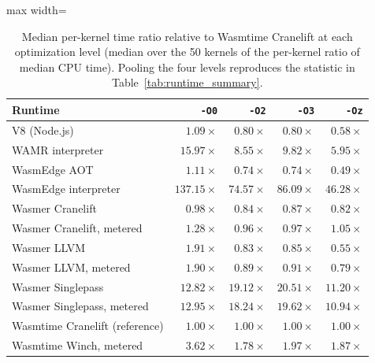 \begin{table}[t]
\caption{Median per-kernel time ratio relative to Wasmtime Cranelift at each optimization level (median over the 50 kernels of the per-kernel ratio of median CPU time). Pooling the four levels reproduces the statistic in Table~\ref{tab:runtime_summary}.}\label{tab:ratio_by_level}
\footnotesize
\setlength{\tabcolsep}{5pt}%
\begin{adjustbox}{max width=\textwidth}%
\begin{tabular}{lrrrr}
\toprule
Runtime & \texttt{-O0} & \texttt{-O2} & \texttt{-O3} & \texttt{-Oz} \\
\midrule
V8 (Node.js) & $1.09\times$ & $0.80\times$ & $0.80\times$ & $0.58\times$ \\
WAMR interpreter & $15.97\times$ & $8.55\times$ & $9.82\times$ & $5.95\times$ \\
WasmEdge AOT & $1.11\times$ & $0.74\times$ & $0.74\times$ & $0.49\times$ \\
WasmEdge interpreter & $137.15\times$ & $74.57\times$ & $86.09\times$ & $46.28\times$ \\
Wasmer Cranelift & $0.98\times$ & $0.84\times$ & $0.87\times$ & $0.82\times$ \\
Wasmer Cranelift, metered & $1.28\times$ & $0.96\times$ & $0.97\times$ & $1.05\times$ \\
Wasmer LLVM & $1.91\times$ & $0.83\times$ & $0.85\times$ & $0.55\times$ \\
Wasmer LLVM, metered & $1.90\times$ & $0.89\times$ & $0.91\times$ & $0.79\times$ \\
Wasmer Singlepass & $12.82\times$ & $19.12\times$ & $20.51\times$ & $11.20\times$ \\
Wasmer Singlepass, metered & $12.95\times$ & $18.24\times$ & $19.62\times$ & $10.94\times$ \\
Wasmtime Cranelift (reference) & $1.00\times$ & $1.00\times$ & $1.00\times$ & $1.00\times$ \\
Wasmtime Winch, metered & $3.62\times$ & $1.78\times$ & $1.97\times$ & $1.87\times$ \\
\bottomrule
\end{tabular}%
\end{adjustbox}
\end{table}
